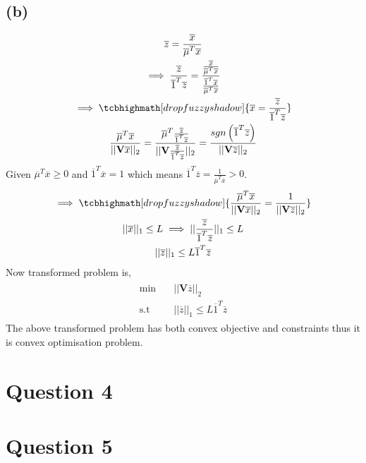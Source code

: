 \documentclass{article}
\begin{document}
\subsection*{(b)}
\begin{gather*}
	\overline{z} = \frac{\overline{x}}{\overline{\mu}^T\overline{x}}\\\implies
	\frac{\overline{z}}{\overline{1}^T\overline{z}} = \frac{\frac{\overline{x}}{\overline{\mu}^T\overline{x}}}{\frac{\overline{1}^T\overline{x}}{\overline{\mu}^T\overline{x}}}\\
	\implies \tcbhighmath[drop fuzzy shadow]{\overline{x} = \frac{\overline{z}}{\overline{1}^T\overline{z}}}\\
	\frac{\overline{\mu}^T\overline{x}}{||\mathbf{V}\overline{x}||_2} = \frac{\overline{\mu}^T\frac{\overline{z}}{\overline{1}^T\overline{z}}}{||\mathbf{V}\frac{\overline{z}}{\overline{1}^T\overline{z}}||_2} = \frac{sgn\left(\overline{1}^T\overline{z}\right)}{||\mathbf{V}\overline{z}||_2}
\end{gather*}
Given $\overline{\mu}^T\overline{x} \ge 0$ and $\overline{1}^T\overline{x} = 1$ which means $\overline{1}^T\overline{z} = \frac{1}{\overline{\mu}^T\overline{x}} > 0$.
\begin{gather*}
	\implies \tcbhighmath[drop fuzzy shadow]{\frac{\overline{\mu}^T\overline{x}}{||\mathbf{V}\overline{x}||_2} = \frac{1}{||\mathbf{V}\overline{z}||_2}}\\
	||\overline{x}||_1 \le L \implies ||\frac{\overline{z}}{\overline{1}^T\overline{z}}||_1 \le L\\
	{||\overline{z}||_1} \le L{\overline{1}^T\overline{z}}
\end{gather*}
Now transformed problem is,
\begin{gather*}
	\begin{aligned}
		\min \quad & ||\mathbf{V}\overline{z}||_2\\
		\textrm{s.t} \quad & {||\overline{z}||_1} \le L{\overline{1}^T\overline{z}}
	\end{aligned}
\end{gather*}
The above transformed problem has both convex objective and constraints thus it is convex optimisation problem.
\section*{\hfil Question 4}
\section*{\hfil Question 5}
\end{document}
